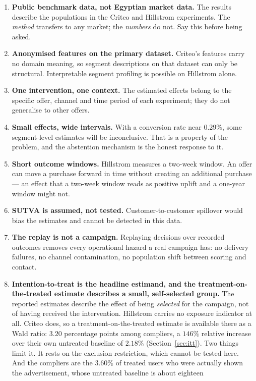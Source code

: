 \documentclass[11pt,a4paper]{article}
\begin{document}
\begin{enumerate}
\item \textbf{Public benchmark data, not Egyptian market data.} The results describe the populations
in the Criteo and Hillstrom experiments. The \emph{method} transfers to any market; the \emph{numbers}
do not. Say this before being asked.
\item \textbf{Anonymised features on the primary dataset.} Criteo's features carry no domain meaning,
so segment descriptions on that dataset can only be structural. Interpretable segment profiling is
possible on Hillstrom alone.
\item \textbf{One intervention, one context.} The estimated effects belong to the specific offer,
channel and time period of each experiment; they do not generalise to other offers.
\item \textbf{Small effects, wide intervals.} With a conversion rate near 0.29\%, some segment-level
estimates will be inconclusive. That is a property of the problem, and the abstention mechanism is
the honest response to it.
\item \textbf{Short outcome windows.} Hillstrom measures a two-week window. An offer can move a
purchase forward in time without creating an additional purchase --- an effect that a two-week
window reads as positive uplift and a one-year window might not.
\item \textbf{SUTVA is assumed, not tested.} Customer-to-customer spillover would bias the estimates
and cannot be detected in this data.
\item \textbf{The replay is not a campaign.} Replaying decisions over recorded outcomes removes
every operational hazard a real campaign has: no delivery failures, no channel contamination, no
population shift between scoring and contact.
\item \textbf{Intention-to-treat is the headline estimand, and the treatment-on-the-treated
estimate describes a small, self-selected group.} The reported estimates describe the effect of
being \emph{selected} for the campaign, not of having received the intervention. Hillstrom carries
no exposure indicator at all. Criteo does, so a treatment-on-the-treated estimate is available
there as a Wald ratio: $3.20$ percentage points among compliers, a $146\%$ relative increase over
their own untreated baseline of $2.18\%$ (Section~\ref{sec:itt}). Two things limit it. It rests on
the exclusion restriction, which cannot be tested here. And the compliers are the $3.60\%$ of
treated users who were actually shown the advertisement, whose untreated baseline is about eighteen

\end{enumerate}
\end{document}
